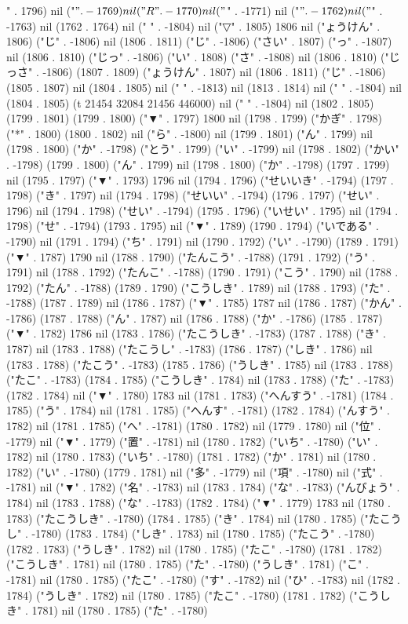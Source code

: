 " . 1796) nil ("$" . -1769) nil ("R" . -1770) nil ("$" . -1771) nil ("$" . -1762) nil ("$" . -1763) nil (1762 . 1764) nil (" " . -1804) nil ("▽" . 1805) 1806 nil ("ょうけん" . 1806) ("じ" . -1806) nil (1806 . 1811) ("じ" . -1806) ("さい" . 1807) ("っ" . -1807) nil (1806 . 1810) ("じっ" . -1806) ("い" . 1808) ("さ" . -1808) nil (1806 . 1810) ("じっさ" . -1806) (1807 . 1809) ("ょうけん" . 1807) nil (1806 . 1811) ("じ" . -1806) (1805 . 1807) nil (1804 . 1805) nil ("
" . -1813) nil (1813 . 1814) nil (" " . -1804) nil (1804 . 1805) (t 21454 32084 21456 446000) nil (" " . -1804) nil (1802 . 1805) (1799 . 1801) (1799 . 1800) ("▼" . 1797) 1800 nil (1798 . 1799) ("かぎ" . 1798) ("*" . 1800) (1800 . 1802) nil ("ら" . -1800) nil (1799 . 1801) ("ん" . 1799) nil (1798 . 1800) ("か" . -1798) ("とう" . 1799) ("い" . -1799) nil (1798 . 1802) ("かい" . -1798) (1799 . 1800) ("ん" . 1799) nil (1798 . 1800) ("か" . -1798) (1797 . 1799) nil (1795 . 1797) ("▼" . 1793) 1796 nil (1794 . 1796) ("せいいき" . -1794) (1797 . 1798) ("き" . 1797) nil (1794 . 1798) ("せいい" . -1794) (1796 . 1797) ("せい" . 1796) nil (1794 . 1798) ("せい" . -1794) (1795 . 1796) ("いせい" . 1795) nil (1794 . 1798) ("せ" . -1794) (1793 . 1795) nil ("▼" . 1789) (1790 . 1794) ("いである" . -1790) nil (1791 . 1794) ("ち" . 1791) nil (1790 . 1792) ("い" . -1790) (1789 . 1791) ("▼" . 1787) 1790 nil (1788 . 1790) ("たんこう" . -1788) (1791 . 1792) ("う" . 1791) nil (1788 . 1792) ("たんこ" . -1788) (1790 . 1791) ("こう" . 1790) nil (1788 . 1792) ("たん" . -1788) (1789 . 1790) ("こうしき" . 1789) nil (1788 . 1793) ("た" . -1788) (1787 . 1789) nil (1786 . 1787) ("▼" . 1785) 1787 nil (1786 . 1787) ("かん" . -1786) (1787 . 1788) ("ん" . 1787) nil (1786 . 1788) ("か" . -1786) (1785 . 1787) ("▼" . 1782) 1786 nil (1783 . 1786) ("たこうしき" . -1783) (1787 . 1788) ("き" . 1787) nil (1783 . 1788) ("たこうし" . -1783) (1786 . 1787) ("しき" . 1786) nil (1783 . 1788) ("たこう" . -1783) (1785 . 1786) ("うしき" . 1785) nil (1783 . 1788) ("たこ" . -1783) (1784 . 1785) ("こうしき" . 1784) nil (1783 . 1788) ("た" . -1783) (1782 . 1784) nil ("▼" . 1780) 1783 nil (1781 . 1783) ("へんすう" . -1781) (1784 . 1785) ("う" . 1784) nil (1781 . 1785) ("へんす" . -1781) (1782 . 1784) ("んすう" . 1782) nil (1781 . 1785) ("へ" . -1781) (1780 . 1782) nil (1779 . 1780) nil ("位" . -1779) nil ("▼" . 1779) ("置" . -1781) nil (1780 . 1782) ("いち" . -1780) ("い" . 1782) nil (1780 . 1783) ("いち" . -1780) (1781 . 1782) ("か" . 1781) nil (1780 . 1782) ("い" . -1780) (1779 . 1781) nil ("多" . -1779) nil ("項" . -1780) nil ("式" . -1781) nil ("▼" . 1782) ("名" . -1783) nil (1783 . 1784) ("な" . -1783) ("んびょう" . 1784) nil (1783 . 1788) ("な" . -1783) (1782 . 1784) ("▼" . 1779) 1783 nil (1780 . 1783) ("たこうしき" . -1780) (1784 . 1785) ("き" . 1784) nil (1780 . 1785) ("たこうし" . -1780) (1783 . 1784) ("しき" . 1783) nil (1780 . 1785) ("たこう" . -1780) (1782 . 1783) ("うしき" . 1782) nil (1780 . 1785) ("たこ" . -1780) (1781 . 1782) ("こうしき" . 1781) nil (1780 . 1785) ("た" . -1780) ("うしき" . 1781) ("こ" . -1781) nil (1780 . 1785) ("たこ" . -1780) ("す" . -1782) nil ("ひ" . -1783) nil (1782 . 1784) ("うしき" . 1782) nil (1780 . 1785) ("たこ" . -1780) (1781 . 1782) ("こうしき" . 1781) nil (1780 . 1785) ("た" . -1780) 